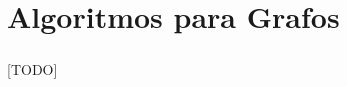 \documentclass{subfiles}
\begin{document}
  \chapter{Algoritmos para Grafos}
  \label{chap:graphs}

    \paragraph{}
    [TODO]
\end{document}
